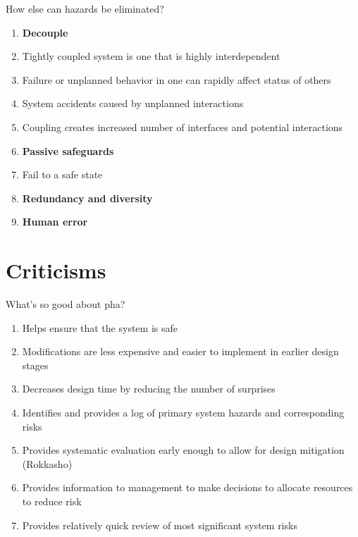 \documentclass[aspectratio=1610,pdftex,dvipsnames,compress,xcolor={dvipsnames}]{beamer}
\newcommand{\acs}{\acrshort} %
\begin{document}
\begin{frame}{How else can hazards be eliminated?}
    \begin{enumerate}[series=outerlist,topsep=0pt,itemsep=1pt,leftmargin=*,label=(\arabic*)]
        \item[]\textbf{Decouple}
        \item[]Tightly coupled system is one that is highly interdependent  
        \item[]Failure or unplanned behavior in one can rapidly affect status of others  
        \item[]System accidents caused by unplanned interactions  
        \item[]Coupling creates increased number of interfaces and potential interactions
            \vspace{0.15in}
        \item[]\textbf{Passive safeguards}
        \item[]Fail to a safe state
            \vspace{0.15in}
        \item[]\textbf{Redundancy and diversity}
            \vspace{0.15in}
        \item[]\textbf{Human error}
    \end{enumerate}
\end{frame}


\section{Criticisms}


\addtocounter{framenumber}{-1}
\begin{frame}{What's so good about \acs{pha}?}
    \begin{enumerate}[series=outerlist,topsep=0pt,itemsep=15pt,leftmargin=*,label=(\arabic*)]
        \item[]Helps ensure that the system is safe
        \item[]Modifications are less expensive and easier to implement in earlier design stages  
        \item[]Decreases design time by reducing the number of surprises  
        \item[]Identifies and provides a log of primary system hazards and corresponding risks
        \item[]Provides systematic evaluation early enough to allow for design mitigation (Rokkasho)
        \item[]Provides information to management to make decisions to allocate resources to reduce risk
        \item[]Provides relatively quick review of most significant system risks
    \end{enumerate}
\end{frame}
\end{document}

